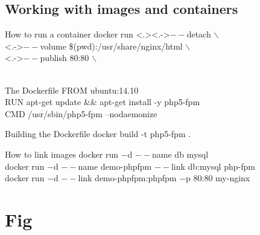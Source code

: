 \documentclass{beamer}
\begin{document}
    \subsection{Working with images and containers}
    \begin{frame}{How to run a container}
        \alert<+>{docker run}
        \alert<.>{\only<.->{$--$detach $\backslash$\\}}
        \alert<+>{\only<.->{$--$volume \$(pwd):/usr/share/nginx/html $\backslash$\\}}
        \alert<+>{\only<.->{$--$publish 80:80 $\backslash$\\}}
        \\
    \end{frame}
    \begin{frame}{The Dockerfile}
        \alert<+>{}
        \alert<+>{FROM ubuntu:14.10\\}
        \alert<+>{RUN apt-get update \&\& apt-get install -y php5-fpm\\}
        \alert<+>{CMD /usr/sbin/php5-fpm --nodaemonize\\}
    \end{frame}
    \begin{frame}{Building the Dockerfile}
        docker build -t php5-fpm .
    \end{frame}
    \begin{frame}{How to link images}
        docker run $-$d \alert<2>{$--$name db} mysql\\
        docker run $-$d \alert<3>{$--$name demo-phpfpm} {$--$link} \alert<2>{db}:mysql php-fpm\\
        docker run $-$d $--$link \alert<3>{demo-phpfpm}:phpfpm $-$p 80:80 my-nginx\\
    \end{frame}
    \section{Fig}
\end{document}
